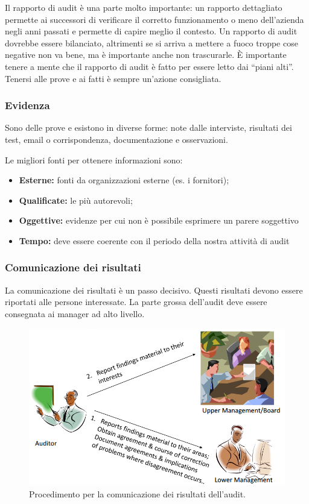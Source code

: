 Il rapporto di audit è una parte molto importante: un rapporto dettagliato
permette ai successori di verificare il corretto funzionamento o meno
dell'azienda negli anni passati e permette di capire meglio il contesto. Un
rapporto di audit dovrebbe essere bilanciato, altrimenti se si arriva a mettere
a fuoco troppe cose negative non va bene, ma è importante anche non trascurarle.
È importante tenere a mente che il rapporto di audit è fatto per essere letto
dai ``piani alti''. Tenersi alle prove e ai fatti è sempre un'azione
consigliata.

\subsubsection{Evidenza}

Sono delle prove e esistono in diverse forme: note dalle interviste, risultati
dei test, email o corrispondenza, documentazione e osservazioni.

Le migliori fonti per ottenere informazioni sono:
\begin{itemize}
\item \textbf{Esterne:} fonti da organizzazioni esterne (es. i fornitori);
\item \textbf{Qualificate:} le più autorevoli;
\item \textbf{Oggettive:} evidenze per cui non è possibile esprimere un
parere soggettivo
\item \textbf{Tempo:} deve essere coerente con il periodo della nostra attività
di audit
\end{itemize}

\subsubsection{Comunicazione dei risultati}

La comunicazione dei risultati è un passo decisivo. Questi risultati devono
essere riportati alle persone interessate.
La parte grossa dell'audit deve essere consegnata ai manager ad alto
livello.

\begin{figure}[h!]
        \begin{center}
                \includegraphics[scale=0.4]{res/img/communication_audit.png}
        \end{center}
        \caption{Procedimento per la comunicazione dei risultati dell'audit.}
\end{figure}

